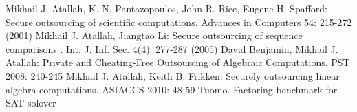 \documentclass[runningheads,a4paper]{llncs}
\begin{document}
\noindent [1]	
\newline [2]	
\newline [3]	
\newline [4]	
\newline[5]	
\newline[6]	
\newline[7]	
\newline[8]	
\newline[9]	
\newline[10]	
\newline[11]	
\newline[12]	
\newline[15]	
\newline[16]	
\newline[17]	
\newline[19]	Mikhail J. Atallah, K. N. Pantazopoulos, John R. Rice, Eugene H. Spafford: Secure outsourcing of scientific computations. Advances in Computers 54: 215-272 (2001)
\newline[20]	Mikhail J. Atallah, Jiangtao Li: Secure outsourcing of sequence comparisons . Int. J. Inf. Sec. 4(4): 277-287 (2005)
\newline[21]	David Benjamin, Mikhail J. Atallah: Private and Cheating-Free Outsourcing of Algebraic Computations. PST 2008: 240-245
\newline[22]	Mikhail J. Atallah, Keith B. Frikken: Securely outsourcing linear algebra computations. ASIACCS 2010: 48-59
\newline[24]	Tuomo. Factoring benchmark for SAT-solover
\end{document}
